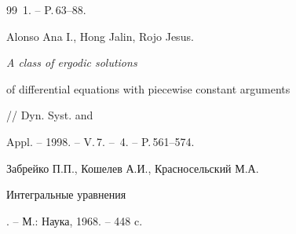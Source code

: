 \begin{thebibliography}{99}
\No\,1. -- P.\,63--88.




Alonso Ana I., Hong Jalin, Rojo Jesus. {\it A class of ergodic solutions


of differential equations with piecewise constant arguments}


// Dyn. Syst. and


Appl. -- 1998. -- V.\,7. -- \No\,4. -- P.\,561--574.




Забрейко П.П., Кошелев А.И., Красносельский М.А. {\it


Интегральные уравнения}. -- М.: Наука, 1968. -- 448 c.





\end{thebibliography}





\vskip 2cm
















\label{end}








